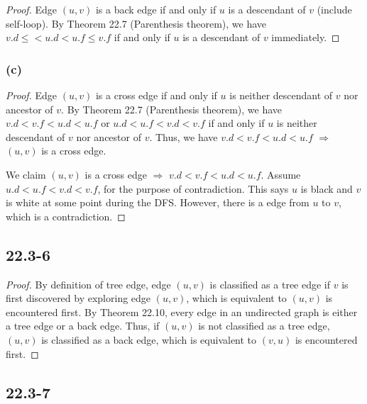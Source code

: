 \begin{proof}
    Edge $(u,v)$ is a back edge if and only if
    $u$ is a descendant of $v$ (include self-loop).
    By Theorem 22.7 (Parenthesis theorem),
    we have $v.d\leq< u.d < u.f \leq v.f$ if and only if
    $u$ is a descendant of $v$ immediately.
\end{proof}

\subsubsection*{(c)}

\begin{proof}
    Edge $(u,v)$ is a cross edge if and only if
    $u$ is neither descendant of $v$ nor ancestor of $v$.
    By Theorem 22.7 (Parenthesis theorem),
    we have $v.d < v.f < u.d < u.f$ or $u.d < u.f < v.d < v.f$ if and only if
    $u$ is neither descendant of $v$ nor ancestor of $v$.
    Thus, we have $v.d < v.f < u.d < u.f$ $\Longrightarrow$ $(u,v)$ is a cross edge.
    
    We claim $(u,v)$ is a cross edge $\Longrightarrow$ $v.d < v.f < u.d < u.f$.
    Assume $u.d < u.f < v.d < v.f$, for the purpose of contradiction.
    This says $u$ is black and $v$ is white at some point during the DFS.
    However, there is a edge from $u$ to $v$, which is a contradiction.
\end{proof}

\subsection*{22.3-6}

\begin{proof}
    By definition of tree edge, edge $(u,v)$ is classified as a tree edge 
    if $v$ is first discovered by exploring edge $(u,v)$,
    which is equivalent to $(u,v)$ is encountered first.
    By Theorem 22.10, 
    every edge in an undirected graph is either a tree edge or a back edge.
    Thus, if $(u,v)$ is not classified as a tree edge,
    $(u,v)$ is classified as a back edge, 
    which is equivalent to $(v,u)$ is encountered first.
\end{proof}

\subsection*{22.3-7}

